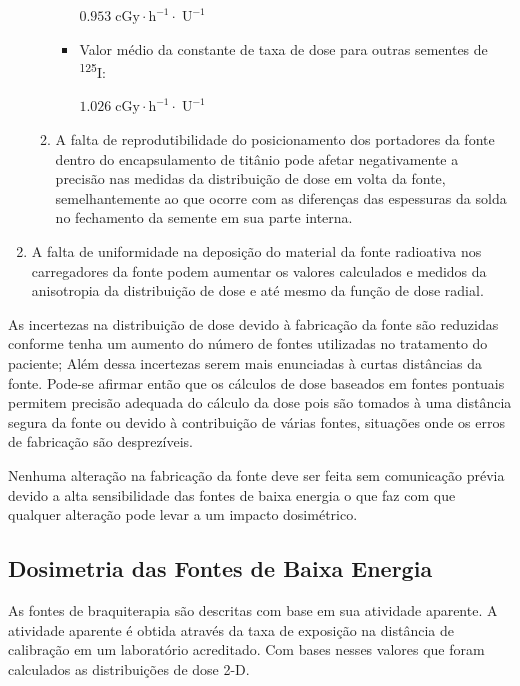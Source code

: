 \documentclass[11pt,a4paper]{article}
\begin{document}
\begin{enumerate}
\begin{enumerate}
\begin{itemize}
											\textbf{$\mathrm{0.953 \; cGy \cdot h^{-1} \cdot \; U^{-1}}$}
										\item Valor médio da constante de taxa de dose para outras sementes de \textsuperscript{125}I:
										
											\textbf{$\mathrm{1.026 \; cGy \cdot h^{-1} \cdot \; U^{-1}}$}
									\end{itemize}

							\item A falta de reprodutibilidade do posicionamento dos portadores da fonte dentro do encapsulamento de titânio pode afetar negativamente a precisão nas medidas da distribuição de dose em volta da fonte, semelhantemente ao que ocorre com as diferenças das espessuras da solda no fechamento da semente em sua parte interna.
							
						\end{enumerate}
					
					\item A falta de uniformidade na deposição do material da fonte radioativa nos carregadores da fonte podem aumentar os valores calculados e medidos da anisotropia da distribuição de dose e até mesmo da função de dose radial.
					
				\end{enumerate}

			As incertezas na distribuição de dose devido à fabricação da fonte são reduzidas conforme tenha um aumento do número de fontes utilizadas no tratamento do paciente; Além dessa incertezas serem mais enunciadas à curtas distâncias da fonte. Pode-se afirmar então que os cálculos de dose baseados em fontes pontuais permitem precisão adequada do cálculo da dose pois são tomados à uma distância segura da fonte ou devido à contribuição de várias fontes, situações onde os erros de fabricação são desprezíveis.

			Nenhuma alteração na fabricação da fonte deve ser feita sem comunicação prévia devido a alta sensibilidade das fontes de baixa energia o que faz com que qualquer alteração pode levar a um impacto dosimétrico.

		\subsection{Dosimetria das Fontes de Baixa Energia}

			As fontes de braquiterapia são descritas com base em sua atividade aparente. A atividade aparente é obtida através da taxa de exposição na distância de calibração em um laboratório acreditado. Com bases nesses valores que foram calculados as distribuições de dose 2-D.
\end{document}
